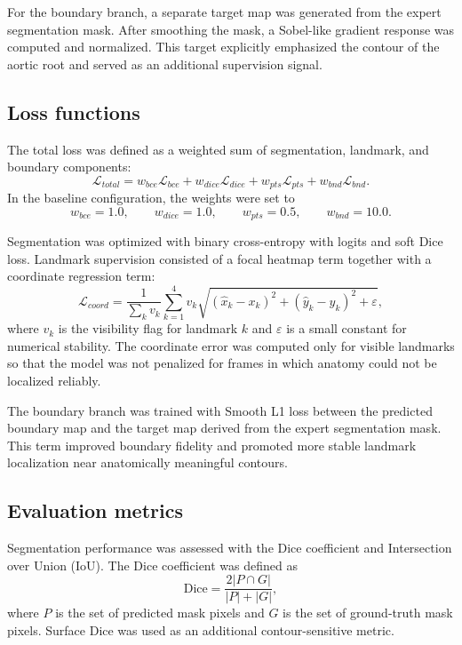 \documentclass[oneside,pdflatex,sn-mathphys-num]{sn-jnl}
\begin{document}
For the boundary branch, a separate target map was generated from the expert segmentation mask. After smoothing the mask, a Sobel-like gradient response was computed and normalized. This target explicitly emphasized the contour of the aortic root and served as an additional supervision signal.

\subsection{Loss functions}\label{subsec:losses}

The total loss was defined as a weighted sum of segmentation, landmark, and boundary components:
\begin{equation}
\mathcal{L}_{total} =
w_{bce}\mathcal{L}_{bce} +
w_{dice}\mathcal{L}_{dice} +
w_{pts}\mathcal{L}_{pts} +
w_{bnd}\mathcal{L}_{bnd}.
\end{equation}
In the baseline configuration, the weights were set to
\begin{equation}
w_{bce}=1.0,\qquad
w_{dice}=1.0,\qquad
w_{pts}=0.5,\qquad
w_{bnd}=10.0.
\end{equation}

Segmentation was optimized with binary cross-entropy with logits and soft Dice loss. Landmark supervision consisted of a focal heatmap term together with a coordinate regression term:
\begin{equation}
\mathcal{L}_{coord} =
\frac{1}{\sum_k v_k}
\sum_{k=1}^{4}
v_k
\sqrt{
(\hat{x}_k-x_k)^2+(\hat{y}_k-y_k)^2+\varepsilon
},
\end{equation}
where $v_k$ is the visibility flag for landmark $k$ and $\varepsilon$ is a small constant for numerical stability. The coordinate error was computed only for visible landmarks so that the model was not penalized for frames in which anatomy could not be localized reliably.

The boundary branch was trained with Smooth L1 loss between the predicted boundary map and the target map derived from the expert segmentation mask. This term improved boundary fidelity and promoted more stable landmark localization near anatomically meaningful contours.

\subsection{Evaluation metrics}\label{subsec:metrics}

Segmentation performance was assessed with the Dice coefficient and Intersection over Union (IoU). The Dice coefficient was defined as
\begin{equation}
\mathrm{Dice} = \frac{2|P \cap G|}{|P| + |G|},
\end{equation}
where $P$ is the set of predicted mask pixels and $G$ is the set of ground-truth mask pixels. Surface Dice was used as an additional contour-sensitive metric.
\end{document}
